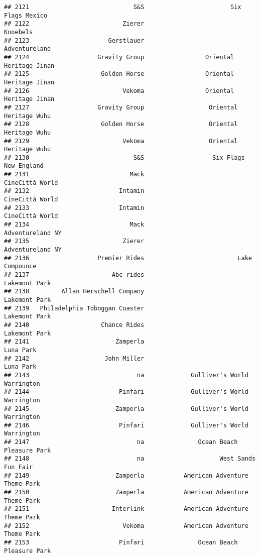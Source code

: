 \documentclass[
]{article}
\begin{document}
\begin{verbatim}
## 2121                             S&S                        Six Flags Mexico
## 2122                          Zierer                                Knoebels
## 2123                      Gerstlauer                           Adventureland
## 2124                   Gravity Group                 Oriental Heritage Jinan
## 2125                    Golden Horse                 Oriental Heritage Jinan
## 2126                          Vekoma                 Oriental Heritage Jinan
## 2127                   Gravity Group                  Oriental Heritage Wuhu
## 2128                    Golden Horse                  Oriental Heritage Wuhu
## 2129                          Vekoma                  Oriental Heritage Wuhu
## 2130                             S&S                   Six Flags New England
## 2131                            Mack                         CineCittà World
## 2132                         Intamin                         CineCittà World
## 2133                         Intamin                         CineCittà World
## 2134                            Mack                        Adventureland NY
## 2135                          Zierer                        Adventureland NY
## 2136                   Premier Rides                          Lake Compounce
## 2137                       Abc rides                           Lakemont Park
## 2138         Allan Herschell Company                           Lakemont Park
## 2139   Philadelphia Toboggan Coaster                           Lakemont Park
## 2140                    Chance Rides                           Lakemont Park
## 2141                        Zamperla                               Luna Park
## 2142                     John Miller                               Luna Park
## 2143                              na             Gulliver's World Warrington
## 2144                         Pinfari             Gulliver's World Warrington
## 2145                        Zamperla             Gulliver's World Warrington
## 2146                         Pinfari             Gulliver's World Warrington
## 2147                              na               Ocean Beach Pleasure Park
## 2148                              na                     West Sands Fun Fair
## 2149                        Zamperla           American Adventure Theme Park
## 2150                        Zamperla           American Adventure Theme Park
## 2151                       Interlink           American Adventure Theme Park
## 2152                          Vekoma           American Adventure Theme Park
## 2153                         Pinfari               Ocean Beach Pleasure Park

\end{verbatim}
\end{document}
